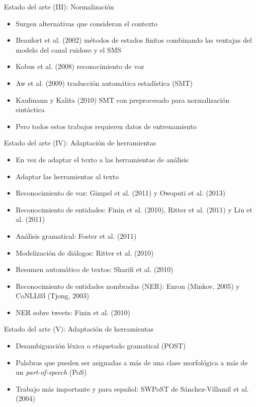 \begin{tframe}{Estado del arte (III): Normalizaci\'on}
	\begin{itemize}
		\item Surgen alternativas que consideran el contexto
		\item Beaufort et al. (2002) m\'etodos de estados finitos combinando las ventajas del modelo del canal ruidoso y el SMS
		\item Kobus et al. (2008) reconocimiento de voz
		\item Aw et al. (2009) traducci\'on autom\'atica estad\'istica (SMT)
		\item<+-> Kaufmann y Kalita (2010) SMT con preprocesado para normalización sint\'actica
		\item<+-| alert@+> Pero todos estos trabajos requieren datos de entrenamiento
	\end{itemize}	
\end{tframe}

\begin{tframe}{Estado del arte (IV): Adaptaci\'on de herramientas}
	\begin{itemize}
		\item En vez de adaptar el texto a las herramientas de an\'alisis
		\item Adaptar las herramientas al texto
		\item Reconocimiento de voz: Gimpel et al. (2011) y Owoputi et al. (2013)
		\item Reconocimiento de entidades: Finin et al. (2010), Ritter et al. (2011) y Liu et al. (2011)
		\item An\'alisis gramatical: Foster et al. (2011)
		\item Modelizaci\'on de di\'alogos: Ritter et al. (2010)
		\item Resumen automático de textos: Sharifi et al. (2010)
		\item Reconocimiento de entidades nombradas (NER): Enron (Minkov, 2005) y CoNLL03 (Tjong, 2003)
		\item NER sobre tweets: Finin et al. (2010)
	\end{itemize}
\end{tframe}

\begin{tframe}{Estado del arte (V): Adaptaci\'on de herramientas}
	\begin{itemize}
		\item Desambiguaci\'on l\'exica o etiquetado gramatical (POST)
		\item Palabras que pueden ser asignadas a m\'as de una clase morfol\'ogica a m\'as de un \textit{part-of-speech} (PoS)
		\item Trabajo más importante y para espa\~nol: SWPoST de S\'anchez-Villamil et al. (2004)
	\end{itemize}
\end{tframe}

